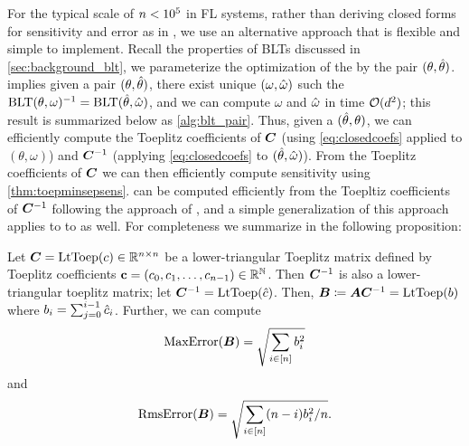 For the typical scale of $n < 10^5$ in FL systems, rather than deriving closed forms for sensitivity and error as in \citet{mcmahan2024efficient}, we use an alternative approach that is flexible and simple to implement. 
Recall the properties of BLTs discussed in \cref{sec:background_blt}, we parameterize the optimization of the \blt by the pair $(\theta, \hat{\theta})$.  \citet[Lem. 5.2]{mcmahan2024efficient} implies given a pair $(\theta, \hat{\theta})$, there exist unique $(\omega, \hat{\omega})$ such the $\text{BLT}(\theta, \omega)^{-1} = \text{BLT}(\hat{\theta}, \hat{\omega})$, and we can compute $\omega$ and $\hat{\omega}$ in time $\mathcal{O}(d^2)$; this result is summarized below as \cref{alg:blt_pair}. Thus, given a $(\hat{\theta}, \theta)$, we can efficiently compute the Toeplitz coefficients of ${\bm{C}}$ (using \cref{eq:closedcoefs} applied to $(\theta, \omega)$) and ${\bm{C}}^{-1}$ (applying \cref{eq:closedcoefs} to $(\hat{\theta}, \hat{\omega})$). From the Toeplitz coefficients of ${\bm{C}}$ we can then efficiently compute sensitivity using \cref{thm:toepminsepsens}. \rmse can be computed efficiently from the Toepltiz coefficients of ${\bm{C}}^{-1}$ following the approach of \citet[Prop. 3.1] {mckenna2024scaling}, and a simple generalization of this approach applies to to \maxerr as well. For completeness we summarize in the following proposition:

\begin{prop}\label{prop:toeperror}
Let ${\bm{C}} = \text{LtToep}(c) \in \mathbb{R}^{n \times n}$ be a lower-triangular Toeplitz matrix defined by Toeplitz coefficients $\mathbf{c} = (c_0, c_1, \dots, c_{n-1}) \in \mathbb{R}^{\mathbb{N}}$. Then ${\bm{C}}^{-1}$ is also a lower-triangular toeplitz matrix; let ${\bm{C}}^{-1} = \text{LtToep}(\hat{c})$. Then, ${\bm{B}} \coloneqq {\bm{A}} {\bm{C}}^{-1} = \text{LtToep}(b)$ where $b_i = \sum_{j=0}^{i-1} \hat{c}_i$. Further, we can compute 
{\small \[ 
\operatorname{MaxError}({\bm{B}}) 
= \sqrt{\sum_{i \in [n]} b_i^2}
\]}%
and
{\small \[ 
\operatorname{RmsError}({\bm{B}}) 
= \sqrt{ \sum_{i \in [n]} (n - i) b_i^2 / n}.
\]}%

\end{prop}

